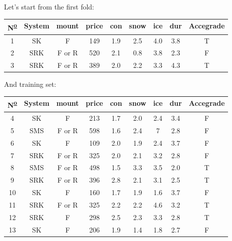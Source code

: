 \documentclass[12pt]{report}
\begin{document}
\begin{solution}
\begin{enumerate}
\begin{figure}[H]
\begin{tikzpicture}[x=0.75pt,y=0.75pt,yscale=-1,xscale=1]
\end{tikzpicture}
            \end{figure}
        Let's start from the first fold:
        \begin{table}[H]
          \centering
          \begin{tabular}{|c|c|c|c|c|c|c|c|c|}
            \hline
            N\textsuperscript{\underline{o}} & System & mount  & price & con & snow & ice & dur & Accegrade \\ \hline
            1 & SK     & F      & 149   & 1.9 & 2.5  & 4.0 & 3.8 & T         \\ \hline
            2 & SRK    & F or R & 520   & 2.1 & 0.8  & 3.8 & 2.3 & F         \\ \hline
            3 & SRK    & F or R & 389   & 2.0 & 2.2  & 3.3 & 4.3 & T         \\ \hline
            \end{tabular}
          \end{table}
        And training set:
        \begin{table}[H]
          \centering
          \begin{tabular}{|c|c|c|c|c|c|c|c|c|}
          \hline
          N\textsuperscript{\underline{o}} & System & mount  & price & con & snow & ice & dur & Accegrade \\ \hline
          4  & SK     & F      & 213   & 1.7 & 2.0  & 2.4 & 3.4 & F         \\ \hline
          5  & SMS    & F or R & 598   & 1.6 & 2.4  & 7   & 2.8 & F         \\ \hline
          6  & SK     & F      & 109   & 2.0 & 1.9  & 2.4 & 3.7 & F         \\ \hline
          7  & SRK    & F or R & 325   & 2.0 & 2.1  & 3.2 & 2.8 & F         \\ \hline
          8  & SMS    & F or R & 498   & 1.5 & 3.3  & 3.5 & 2.0 & T         \\ \hline
          9  & SRK    & F or R & 396   & 2.8 & 2.1  & 3.1 & 2.5 & T         \\ \hline
          10 & SK     & F      & 160   & 1.7 & 1.9  & 1.6 & 3.7 & F         \\ \hline
          11 & SRK    & F or R & 325   & 2.2 & 2.2  & 4.6 & 3.2 & T         \\ \hline
          12 & SRK    & F      & 298   & 2.5 & 2.3  & 3.3 & 2.8 & T         \\ \hline
          13 & SK     & F      & 206   & 1.9 & 1.4  & 1.8 & 2.7 & F         \\ \hline

\end{tabular}
\end{table}
\end{enumerate}
\end{solution}
\end{document}
